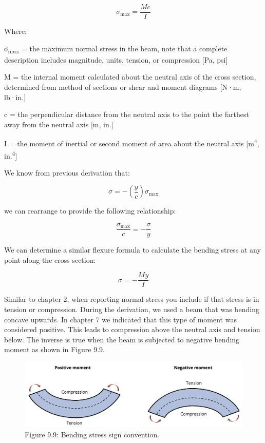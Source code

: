 \documentclass[
  letterpaper,
  DIV=11,
  numbers=noendperiod]{scrreprt}
\begin{document}
\[
\sigma_{\max }=\frac{M c}{I}
\]

Where:

σ\textsubscript{max} = the maximum normal stress in the beam, note that
a complete description includes magnitude, units, tension, or
compression {[}Pa, psi{]}

M = the internal moment calculated about the neutral axis of the cross
section, determined from method of sections or shear and moment diagrams
{[}N·m, lb·in.{]}

c = the perpendicular distance from the neutral axis to the point the
farthest away from the neutral axis {[}m, in.{]}

I = the moment of inertial or second moment of area about the neutral
axis {[}m\textsuperscript{4}, in.\textsuperscript{4}{]}

We know from previous derivation that:

\[
\sigma=-\left(\frac{y}{c}\right) \sigma_{\max }
\]

we can rearrange to provide the following relationship:

\[
\frac{\sigma_{\max }}{c}=-\frac{\sigma}{y}
\]

We can determine a similar flexure formula to calculate the bending
stress at any point along the cross section:

\[
\sigma=-\frac{M y}{I}
\]

Similar to chapter 2, when reporting normal stress you include if that
stress is in tension or compression. During the derivation, we used a
beam that was bending concave upwards. In chapter 7 we indicated that
this type of moment was considered positive. This leads to compression
above the neutral axis and tension below. The inverse is true when the
beam is subjected to negative bending moment as shown in Figure 9.9.

\begin{figure}[H]

{\centering \includegraphics[width=5.19792in,height=\textheight]{images/CH9 PNGs/Figure 9.9.png}

}

\caption{Figure 9.9: Bending stress sign convention.}

\end{figure}%
\end{document}
